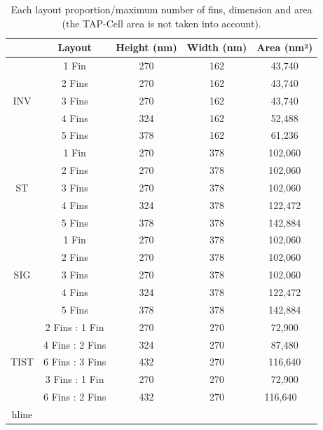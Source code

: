 \documentclass[pgmicro,mestrado,english]{iiufrgs}
\begin{document}
\begin{table}[]
\centering
\caption{Each layout proportion/maximum number of fins, dimension and area (the TAP-Cell area is not taken into account).}
\label{tab:areas}
\begin{tabular}{|c|c|c|c|c|}
\hline
                      & Layout & Height (nm) & Width (nm) & Area (nm²) \\ \hline
\multirow{5}{*}{INV}  & 1 Fin             & 270         & 162        & 43,740  \\ \cline{2-5} 
                      & 2 Fins             & 270         & 162        & 43,740  \\ \cline{2-5} 
                      & 3 Fins             & 270         & 162        & 43,740  \\ \cline{2-5} 
                      & 4 Fins             & 324         & 162        & 52,488 \\ \cline{2-5} 
                      & 5 Fins             & 378         & 162        & 61,236 \\ \hline
\multirow{5}{*}{ST}   & 1 Fin             & 270         & 378        & 102,060 \\ \cline{2-5} 
                      & 2 Fins             & 270         & 378        & 102,060 \\ \cline{2-5} 
                      & 3 Fins             & 270         & 378        & 102,060 \\ \cline{2-5} 
                      & 4 Fins             & 324         & 378        & 122,472 \\ \cline{2-5} 
                      & 5 Fins             & 378         & 378        & 142,884 \\ \hline
\multirow{5}{*}{SIG}  & 1 Fin             & 270         & 378        & 102,060 \\ \cline{2-5} 
                      & 2 Fins             & 270         & 378        & 102,060 \\ \cline{2-5} 
                      & 3 Fins             & 270         & 378        & 102,060 \\ \cline{2-5} 
                      & 4 Fins             & 324         & 378        & 122,472 \\ \cline{2-5} 
                      & 5 Fins             & 378         & 378        & 142,884 \\ \hline
\multirow{5}{*}{TIST} & 2 Fins : 1 Fin             & 270         & 270        & 72,900 \\ \cline{2-5} 
                      & 4 Fins : 2 Fins             & 324         & 270        & 87,480  \\ \cline{2-5} 
                      & 6 Fins : 3 Fins             & 432         & 270        & 116,640  \\ \cline{2-5} 
                      & 3 Fins : 1 Fin             & 270         & 270        & 72,900 \\ \cline{2-5} 
                      & 6 Fins : 2 Fins             & 432         & 270        & 116,640  \ \\hline
\end{tabular}
\end{table}
\end{document}
